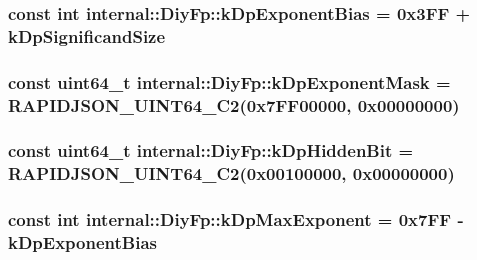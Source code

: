 \subsubsection[{\texorpdfstring{k\+Dp\+Exponent\+Bias}{kDpExponentBias}}]{\setlength{\rightskip}{0pt plus 5cm}const int internal\+::\+Diy\+Fp\+::k\+Dp\+Exponent\+Bias = 0x3\+F\+F + k\+Dp\+Significand\+Size\hspace{0.3cm}{\ttfamily [static]}}\hypertarget{structinternal_1_1DiyFp_a38b6f864ae0859d43fa96c3ff27959be}{}\label{structinternal_1_1DiyFp_a38b6f864ae0859d43fa96c3ff27959be}
\subsubsection[{\texorpdfstring{k\+Dp\+Exponent\+Mask}{kDpExponentMask}}]{\setlength{\rightskip}{0pt plus 5cm}const {\bf uint64\+\_\+t} internal\+::\+Diy\+Fp\+::k\+Dp\+Exponent\+Mask = {\bf R\+A\+P\+I\+D\+J\+S\+O\+N\+\_\+\+U\+I\+N\+T64\+\_\+\+C2}(0x7\+F\+F00000, 0x00000000)\hspace{0.3cm}{\ttfamily [static]}}\hypertarget{structinternal_1_1DiyFp_aaacbf068c44275f4451db750938bd1d3}{}\label{structinternal_1_1DiyFp_aaacbf068c44275f4451db750938bd1d3}
\subsubsection[{\texorpdfstring{k\+Dp\+Hidden\+Bit}{kDpHiddenBit}}]{\setlength{\rightskip}{0pt plus 5cm}const {\bf uint64\+\_\+t} internal\+::\+Diy\+Fp\+::k\+Dp\+Hidden\+Bit = {\bf R\+A\+P\+I\+D\+J\+S\+O\+N\+\_\+\+U\+I\+N\+T64\+\_\+\+C2}(0x00100000, 0x00000000)\hspace{0.3cm}{\ttfamily [static]}}\hypertarget{structinternal_1_1DiyFp_a43ea451ce20095b1ff53cccf132ca15f}{}\label{structinternal_1_1DiyFp_a43ea451ce20095b1ff53cccf132ca15f}
\subsubsection[{\texorpdfstring{k\+Dp\+Max\+Exponent}{kDpMaxExponent}}]{\setlength{\rightskip}{0pt plus 5cm}const int internal\+::\+Diy\+Fp\+::k\+Dp\+Max\+Exponent = 0x7\+F\+F -\/ k\+Dp\+Exponent\+Bias\hspace{0.3cm}{\ttfamily [static]}}\hypertarget{structinternal_1_1DiyFp_a80535a5594dae96fc482757a54162c7d}{}\label{structinternal_1_1DiyFp_a80535a5594dae96fc482757a54162c7d}
